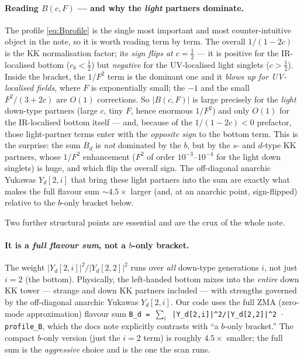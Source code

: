 \documentclass[11pt]{article}
\newcommand{\code}[1]{\texttt{#1}}
\theoremstyle{definition}
\begin{document}
\paragraph{Reading $B(c,F)$ --- and why the \emph{light} partners dominate.} The
profile \eqref{eq:Bprofile} is the single most important and most counter-intuitive
object in the note, so it is worth reading term by term. The overall $1/(1-2c)$ is
the KK normalisation factor; its \emph{sign flips at $c=\tfrac12$} --- it is
positive for the IR-localised bottom ($c_b<\tfrac12$) but \emph{negative} for the
UV-localised light singlets ($c>\tfrac12$). Inside the bracket, the $1/F^2$ term is
the dominant one and it \emph{blows up for UV-localised fields}, where $F$ is
exponentially small; the $-1$ and the small $F^2/(3+2c)$ are $O(1)$ corrections. So
$|B(c,F)|$ is large precisely for the \emph{light} down-type partners (large $c$,
tiny $F$, hence enormous $1/F^2$) and only $O(1)$ for the IR-localised bottom
itself --- and, because of the $1/(1-2c)<0$ prefactor, those light-partner terms
enter with the \emph{opposite sign} to the bottom term. This is the surprise: the
sum $B_d$ is \emph{not} dominated by the $b$, but by the $s$- and $d$-type KK
partners, whose $1/F^2$ enhancement ($F^2$ of order $10^{-3}$--$10^{-4}$ for the
light down singlets) is huge, and which flip the overall sign. The off-diagonal
anarchic Yukawas $Y_d[2,i]$ that bring these light partners into the sum are
exactly what makes the full flavour sum $\sim 4.5\times$ larger (and, at an
anarchic point, sign-flipped) relative to the $b$-only bracket below.

Two further structural points are essential and are the crux of the whole note.

\paragraph{It is a \emph{full flavour sum}, not a $b$-only bracket.} The weight
$|Y_d[2,i]|^2/|Y_d[2,2]|^2$ runs over \emph{all} down-type generations $i$, not
just $i=2$ (the bottom). Physically, the left-handed bottom mixes into the
\emph{entire} down KK tower --- strange and down KK partners included --- with
strengths governed by the off-diagonal anarchic Yukawas $Y_d[2,i]$. Our code uses
the full ZMA (zero-mode approximation) flavour sum
\code{B\_d = $\sum_i$ |Y\_d[2,i]|\^{}2/|Y\_d[2,2]|\^{}2 $\cdot$ profile\_B}, which
the docs note explicitly contrasts with ``a $b$-only bracket.'' The compact
$b$-only version (just the $i=2$ term) is roughly $4.5\times$ smaller; the full
sum is the \emph{aggressive} choice and is the one the scan runs.
\end{document}
